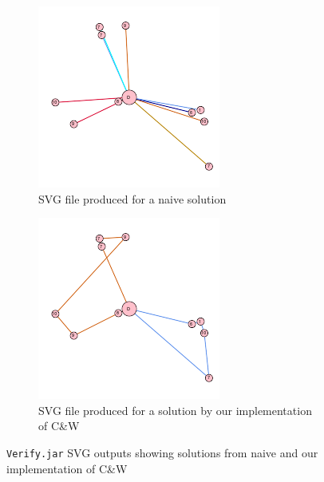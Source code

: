 \documentclass[a4paper]{article}
\begin{document}
        \begin{figure}[h]
            \centering
            \begin{subfigure}{.5\textwidth}
                \centering
                \includegraphics[width=.4\linewidth]{images/10-customers-naive.png}
                \caption{SVG file produced for a naive solution}
                \label{fig:sub1}
            \end{subfigure}%
            \begin{subfigure}{.5\textwidth}
                \centering
                \includegraphics[width=.4\linewidth]{images/10-customers-routed.png}
                \caption{SVG file produced for a solution by our implementation of C\&W}
                \label{fig:sub1}
            \end{subfigure}
            \caption{\texttt{Verify.jar} SVG outputs showing solutions from naive and our implementation of C\&W}
            \label{fig:speedandefficiency}
        \end{figure}
        
\end{document}
